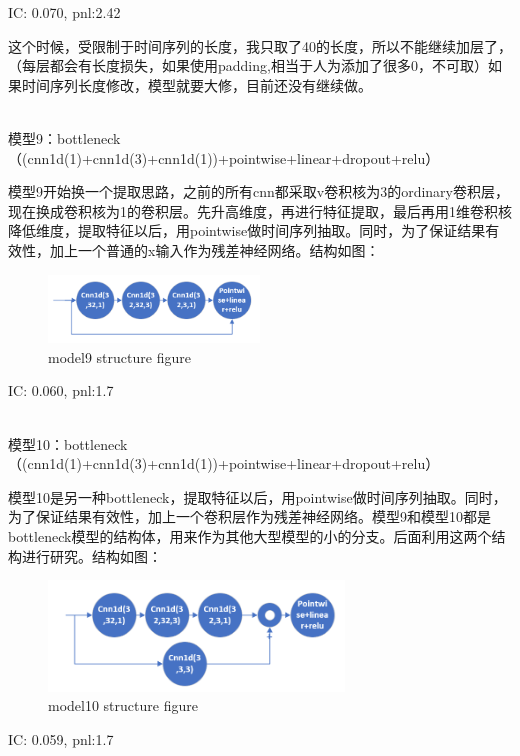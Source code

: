 \documentclass[11pt]{ctexart}
\begin{document}
{\kaishu \small IC: 0.070, pnl:2.42}

这个时候，受限制于时间序列的长度，我只取了40的长度，所以不能继续加层了，（每层都会有长度损失，如果使用padding,相当于人为添加了很多0，不可取）如果时间序列长度修改，模型就要大修，目前还没有继续做。

~\\
模型9：bottleneck（(cnn1d(1)+cnn1d(3)+cnn1d(1))+pointwise+linear+dropout+relu）

模型9开始换一个提取思路，之前的所有cnn都采取v卷积核为3的ordinary卷积层，现在换成卷积核为1的卷积层。先升高维度，再进行特征提取，最后再用1维卷积核降低维度，提取特征以后，用pointwise做时间序列抽取。同时，为了保证结果有效性，加上一个普通的x输入作为残差神经网络。结构如图：
\begin{figure}[H]
\begin{center}
\includegraphics[width=0.5\textwidth]{str6.PNG}
\end{center}
\caption{model9 structure figure}
\label{FIG.6}
\end{figure}

{\kaishu \small IC: 0.060, pnl:1.7}

~\\
模型10：bottleneck（(cnn1d(1)+cnn1d(3)+cnn1d(1))+pointwise+linear+dropout+relu）

模型10是另一种bottleneck，提取特征以后，用pointwise做时间序列抽取。同时，为了保证结果有效性，加上一个卷积层作为残差神经网络。模型9和模型10都是bottleneck模型的结构体，用来作为其他大型模型的小的分支。后面利用这两个结构进行研究。结构如图：
\begin{figure}[H]
\begin{center}
\includegraphics[width=0.7\textwidth]{str7.PNG}
\end{center}
\caption{model10 structure figure}
\label{FIG.7}
\end{figure}

{\kaishu \small IC: 0.059, pnl:1.7}
\end{document}
